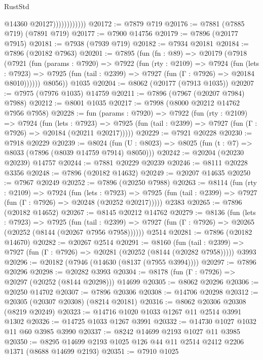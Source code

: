 \begin{lexlean}{RustStd}
\begin{coremodule}
                            @14360
                            @20127))))))))))))
@20172 := @7879 @719
@20176 := @7881 (@7885 @719) (@7891 @719)
@20177 := @7900 @14756
@20179 := @7896 (@20177 @7915)
@20181 := @7938 (@7939 @719)
@20182 := @7934 @20181
@20184 := @7896 (@20182 @7963)
@20201 := @7895
    (fun (fn : @89) =>
    @20179
      (@7918
        (@7921
          (fun (params : @7920) =>
          @7922
            (fun (rty : @2109) =>
            @7924
              (fun (lets : @7923) =>
              @7925 (fun (tail : @2399) => @7927 (fun (Γ : @7926) => @20184 @8010))))))
        @8056))
    @1035
@20204 := @8062 (@20177 (@7913 @1035))
@20207 := @7975 (@7976 @1035) @14759
@20211 := @7896 (@7967 (@20207 @7984) @7988)
@20212 := @8001 @1035
@20217 := @7998 (@8000 @20212 @14762 @7956 @7958)
@20228 := fun (params : @7920) =>
  @7922
    (fun (rty : @2109) =>
    @7924
      (fun (lets : @7923) =>
      @7925 (fun (tail : @2399) => @7927 (fun (Γ : @7926) => @20184 (@20211 @20217)))))
@20229 := @7921 @20228
@20230 := @7918 @20229
@20239 := @8024
    (fun (U : @8023) => @8025 (fun (t : @7) => @8033 (@7896 (@8039 @14759 @7914) @8050)))
@20242 := @20204 (@20230 @20239) @14757
@20244 := @7881 @20229 @20239
@20246 := @8111 @20228 @3356
@20248 := @7896 (@20182 @14632)
@20249 := @20207 @14635
@20250 := @7967 @20249
@20252 := @7896 (@20250 @7988)
@20263 := @8114
    (fun (rty : @2109) =>
    @7924
      (fun (lets : @7923) =>
      @7925 (fun (tail : @2399) => @7927 (fun (Γ : @7926) => @20248 (@20252 @20217)))))
    @2383
@20265 := @7896 (@20182 @14652)
@20267 := @8145 @20212 @14762
@20279 := @8136
    (fun (lets : @7923) =>
    @7925
      (fun (tail : @2399) =>
      @7927 (fun (Γ : @7926) => @20265 (@20252 (@8144 (@20267 @7956 @7958))))))
    @2514
@20281 := @7896 (@20182 @14670)
@20282 := @20267 @2514
@20291 := @8160
    (fun (tail : @2399) => @7927 (fun (Γ : @7926) => @20281 (@20252 (@8144 (@20282 @7958)))))
    @3993
@20296 := @20182 (@7946 (@14630 (@8137 (@7955 @3994))))
@20297 := @7896 @20296
@20298 := @20282 @3993
@20304 := @8178 (fun (Γ : @7926) => @20297 (@20252 (@8144 @20298))) @14699
@20305 := @8062 @20296
@20306 := @20250 @14702
@20307 := @7896 @20306
@20308 := @14706 @20298
@20312 := @20305 (@20307 @20308) (@8214 @20181)
@20316 := @8062 @20306 @20308 (@8219 @20249)
@20323 := @14716 @1020 @1033 @1267 @11 @2514 @3991 @1302
@20326 := @14725 @1033 @1267 @3991
@20332 := @14730 @1027 @1032 @11 @60 @3985 @3990
@20337 := @8242 @14699 @2193 @1027 @11 @3985
@20350 := @8295 @14699 @2193 @1025 @126 @44 @11 @2514 @2412 @2206 @1371 (@8688 @14699 @2193)
@20351 := @7910 @1025

\end{coremodule}
\end{lexlean}

